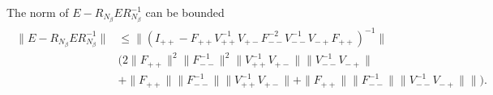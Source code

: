 \begin{proposition}\label{prop:errBoundTriangle}
    The norm of $E-R_{N_\beta}ER_{N_\beta}^{-1}$ can be bounded
    \begin{align}
    \begin{split}
        \|E-R_{N_\beta}ER_{N_\beta}^{-1}\|&\leq
        \|(I_{++}-F_{++}V_{++}^{-1}V_{+-}F_{--}^{-2}
        V_{--}^{-1}V_{-+}F_{++})^{-1}\|\\
        &\big(
        2\|F_{++}\|^2\|F_{--}^{-1}\|^2\|V_{++}^{-1}V_{+-}\|
        \|V_{--}^{-1}V_{-+}\|\\
        &+\|F_{++}\|\|F_{--}^{-1}\|\|V_{++}^{-1}V_{+-}\|+\|F_{++}\|
        \|F_{--}^{-1}\|\|V_{--}^{-1}V_{-+}\|\|
        \big).
    \end{split}
    \label{eq:errBoundTriangleFinal}
    \end{align}
\end{proposition}
